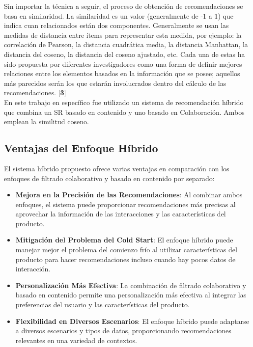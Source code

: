 \documentclass{llncs}
\begin{document}
Sin importar la técnica a seguir, el proceso de obtención de recomendaciones se basa en similaridad. La similaridad es un valor (generalmente de -1 a 1) que indica cuan relacionados están dos componentes. Generalmente se usan las medidas de distancia entre ítems para representar esta medida, por ejemplo: la correlación de Pearson, la distancia cuadrática media, la distancia Manhattan, la distancia del coseno, la distancia del coseno ajustado, etc. Cada una de estas ha sido propuesta por diferentes investigadores como una forma de definir mejores relaciones entre los elementos basados en la información que se posee; aquellos más parecidos serán los que estarán involucrados dentro del cálculo de las recomendaciones. [\textbf{3}] \\
En este trabajo en específico fue utilizado un sistema de recomendación híbrido que combina un SR basado en contenido y uno basado en Colaboración. Ambos emplean la similitud coseno.


\subsection{Ventajas del Enfoque Híbrido}
El sistema híbrido propuesto ofrece varias ventajas en comparación con los enfoques de filtrado colaborativo y basado en contenido por separado:

\begin{itemize}
    \item \textbf{Mejora en la Precisión de las Recomendaciones}: Al combinar ambos enfoques, el sistema puede proporcionar recomendaciones más precisas al aprovechar la información de las interacciones y las características del producto.
    \item \textbf{Mitigación del Problema del Cold Start}: El enfoque híbrido puede manejar mejor el problema del comienzo frío al utilizar características del producto para hacer recomendaciones incluso cuando hay pocos datos de interacción.
    \item \textbf{Personalización Más Efectiva}: La combinación de filtrado colaborativo y basado en contenido permite una personalización más efectiva al integrar las preferencias del usuario y las características del producto.
    \item \textbf{Flexibilidad en Diversos Escenarios}: El enfoque híbrido puede adaptarse a diversos escenarios y tipos de datos, proporcionando recomendaciones relevantes en una variedad de contextos.
\end{itemize}
\end{document}
